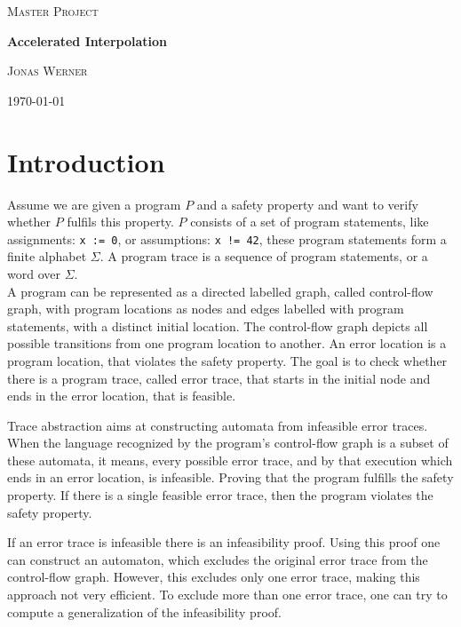 \documentclass{article}
\begin{document}
	\newcommand{\HorizontalLine}{\rule{\linewidth}{0.3mm}}
	
		\begin{center}
		{\scshape\Large Master Project \par}
		\vspace{1.5cm}
		{\huge\bfseries Accelerated Interpolation \par}
		\vspace{1cm}
		{\large \scshape Jonas Werner\par}
		\vspace{0.5cm}
		{\today \vspace{2cm}} 
		
		\end{center}

\section{Introduction}
Assume we are given a program $P$ and a safety property and want to verify whether $P$ fulfils this property. $P$ consists of a set of program statements, like assignments: \texttt{x := 0}, or assumptions: \texttt{x != 42}, these program statements form a finite alphabet $\Sigma$. A program trace is a sequence of program statements, or a word over $\Sigma$. \\
A program can be represented as a directed labelled graph, called control-flow graph, with program locations as nodes and edges labelled with program statements, with a distinct initial location. The control-flow graph depicts all possible transitions from one program location to another. An error location is a program location, that violates the safety property. The goal is to check whether there is a program trace, called error trace, that starts in the initial node and ends in the error location, that is feasible. 

Trace abstraction aims at constructing automata \cite{10.1007/978-3-642-39799-8_2} from infeasible error traces. When the language recognized by the program's control-flow graph is a subset of these automata, it means, every possible error trace, and by that execution which ends in an error location, is infeasible. Proving that the program fulfills the safety property. If there is a single feasible error trace, then the program violates the safety property.\\
\par 
If an error trace is infeasible there is an infeasibility proof. Using this proof one can construct an automaton, which excludes the original error trace from the control-flow graph. However, this excludes only one error trace, making this approach not very efficient. To exclude more than one error trace, one can try to compute a generalization of the infeasibility proof. \par
\end{document}
